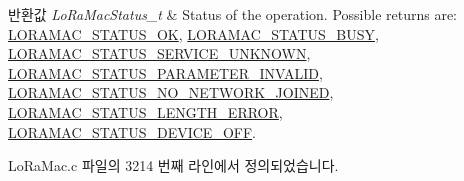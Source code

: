 \begin{DoxyRetVals}{반환값}
{\em Lo\+Ra\+Mac\+Status\+\_\+t} & Status of the operation. Possible returns are\+: \mbox{\hyperlink{group___l_o_r_a_m_a_c_gga1d18f26b344040b3ec5c3db662919661a03db5fca052313edb3823c014b653a74}{L\+O\+R\+A\+M\+A\+C\+\_\+\+S\+T\+A\+T\+U\+S\+\_\+\+OK}}, \mbox{\hyperlink{group___l_o_r_a_m_a_c_gga1d18f26b344040b3ec5c3db662919661a66b12f569207eacd97ee1c1d6c4cee6d}{L\+O\+R\+A\+M\+A\+C\+\_\+\+S\+T\+A\+T\+U\+S\+\_\+\+B\+U\+SY}}, \mbox{\hyperlink{group___l_o_r_a_m_a_c_gga1d18f26b344040b3ec5c3db662919661aff502a87db22d6a9a4919e4b54c7c1cf}{L\+O\+R\+A\+M\+A\+C\+\_\+\+S\+T\+A\+T\+U\+S\+\_\+\+S\+E\+R\+V\+I\+C\+E\+\_\+\+U\+N\+K\+N\+O\+WN}}, \mbox{\hyperlink{group___l_o_r_a_m_a_c_gga1d18f26b344040b3ec5c3db662919661ad0d3119f247d00e1787dda106fcb3017}{L\+O\+R\+A\+M\+A\+C\+\_\+\+S\+T\+A\+T\+U\+S\+\_\+\+P\+A\+R\+A\+M\+E\+T\+E\+R\+\_\+\+I\+N\+V\+A\+L\+ID}}, \mbox{\hyperlink{group___l_o_r_a_m_a_c_gga1d18f26b344040b3ec5c3db662919661a105228330376111d46d99d57688a20ae}{L\+O\+R\+A\+M\+A\+C\+\_\+\+S\+T\+A\+T\+U\+S\+\_\+\+N\+O\+\_\+\+N\+E\+T\+W\+O\+R\+K\+\_\+\+J\+O\+I\+N\+ED}}, \mbox{\hyperlink{group___l_o_r_a_m_a_c_gga1d18f26b344040b3ec5c3db662919661a4ab40311dcd2eeffc77f573a919b29b1}{L\+O\+R\+A\+M\+A\+C\+\_\+\+S\+T\+A\+T\+U\+S\+\_\+\+L\+E\+N\+G\+T\+H\+\_\+\+E\+R\+R\+OR}}, \mbox{\hyperlink{group___l_o_r_a_m_a_c_gga1d18f26b344040b3ec5c3db662919661aff1d3a91250809d1770a74776057b8ce}{L\+O\+R\+A\+M\+A\+C\+\_\+\+S\+T\+A\+T\+U\+S\+\_\+\+D\+E\+V\+I\+C\+E\+\_\+\+O\+FF}}. \\
\hline
\end{DoxyRetVals}


Lo\+Ra\+Mac.\+c 파일의 3214 번째 라인에서 정의되었습니다.


